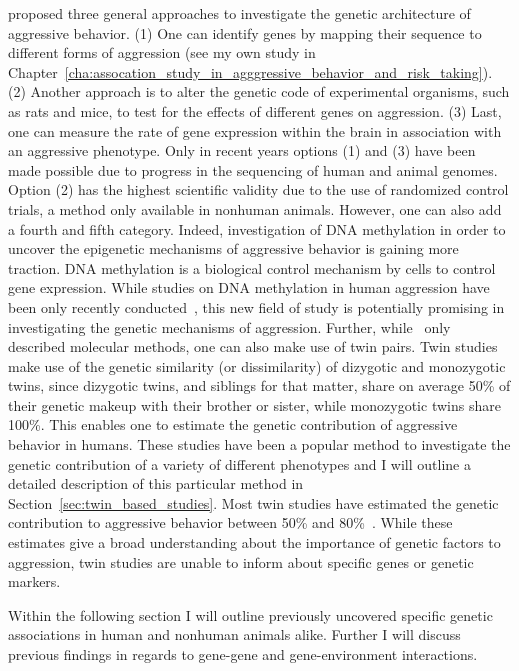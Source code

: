 \citet{Maxson2005} proposed three general approaches to investigate the genetic architecture of aggressive behavior.
(1) One can identify genes by mapping their sequence to different forms of aggression (see my own study in Chapter~\ref{cha:assocation_study_in_agggressive_behavior_and_risk_taking}).
(2) Another approach is to alter the genetic code of experimental organisms, such as rats and mice, to test for the effects of different genes on aggression.
(3) Last, one can measure the rate of gene expression within the brain in association with an aggressive phenotype.
Only in recent years options (1) and (3) have been made possible due to progress in the sequencing of human and animal genomes.
Option (2) has the highest scientific validity due to the use of randomized control trials, a method only available in nonhuman animals.
However, one can also add a fourth and fifth category.
Indeed, investigation of DNA methylation in order to uncover the epigenetic mechanisms of aggressive behavior is gaining more traction.
DNA methylation is a biological control mechanism by cells to control gene expression.
While studies on DNA methylation in human aggression have been only recently  conducted~\cite{VanDongen2015a}, this new field of study is potentially promising in investigating the genetic mechanisms of aggression.
Further, while~\citet{Maxson2005} only described molecular methods, one can also make use of twin pairs.
Twin studies make use of the genetic similarity (or dissimilarity) of dizygotic and monozygotic twins, since dizygotic twins, and siblings for that matter, share on average 50\% of their genetic makeup with their brother or sister, while monozygotic twins share 100\%.
This enables one to estimate the genetic contribution of aggressive behavior in humans.
These studies have been a popular method to investigate the genetic contribution of a variety of different phenotypes and I will outline a detailed description of this particular method in Section~\ref{sec:twin_based_studies}. 
Most twin studies have estimated the genetic contribution to aggressive behavior between 50\% and 80\%~\cite{Porsch2016}.
While these estimates give a broad understanding about the importance of genetic factors  to aggression, twin studies are unable to inform about specific genes or genetic markers.

Within the following section I will outline previously uncovered specific genetic associations in human and nonhuman animals alike.
Further I will discuss previous findings in regards to gene-gene and gene-environment interactions.

